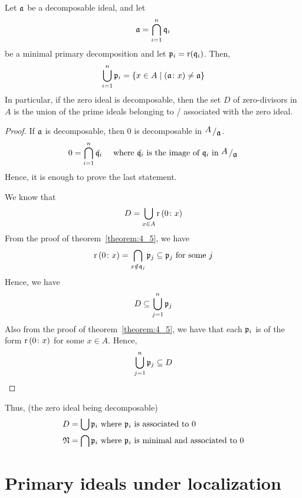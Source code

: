 \begin{proposition}{}{}
\label{prop:4_7}
	Let \(\mathfrak{a}\) be a decomposable ideal, and let
	\[
		\mathfrak{a} = \bigcap_{i = 1}^{n} \mathfrak{q}_i
	\]
	be a minimal primary decomposition and let \(\mathfrak{p}_i = \operatorname{r}(\mathfrak{q}_i)\).
	Then,
	\[
		\bigcup_{i=1}^n \mathfrak{p}_i =
		\left\{ x \in A \mid \left( \mathfrak{a} \colon x \right) \neq \mathfrak{a} \right\}
	\]
	In particular, if the zero ideal is decomposable, then the set \(D\)
	of zero-divisors in \(A\) is the union of the prime ideals
	belonging to / associated with the zero ideal.
\end{proposition}
\begin{proof}
	If \(\mathfrak{a}\) is decomposable, then 0 is decomposable in
	\(\bigslant{A}{\mfa}\).
	\[
		0 = \bigcap_{i = 1}^{n} \bar{\mfq_i} \quad \text{ where }
		\bar{\mfq_i} \text{ is the image of } \mfq_i \text{ in }
		\bigslant{A}{\mfa}
	\]
	Hence, it is enough to prove the last statement.

	We know that
	\[
		D = \bigcup_{x \in A} \operatorname{r}\left( 0 \colon x \right)
	\]
	From the proof of theorem~\ref{theorem:4_5}, we have
	\[
		\operatorname{r}\left( 0 \colon x \right) = \bigcap_{x \notin \mathfrak{q}_j} \mathfrak{p}_j
		\subseteq \mathfrak{p}_j \text{ for some } j
	\]
	Hence, we have
	\[
		D \subseteq \bigcup_{j = 1}^{n} \mathfrak{p}_j
	\]
	Also from the proof of theorem~\ref{theorem:4_5}, we have
	that each \(\mathfrak{p}_i\) is of the form \(\operatorname{r}\left( 0 \colon x \right)\)
	for some \(x \in A\).
	Hence,
	\[
		\bigcup_{j = 1}^{n} \mathfrak{p}_j \subseteq D
	\]
\end{proof}

Thus, (the zero ideal being decomposable)
\begin{align*}
	D &= \bigcup \mathfrak{p}_i \text{ where } \mathfrak{p}_i \text{ is associated to } 0 \\
	\mathfrak{N} &= \bigcap \mathfrak{p}_i \text{ where } \mathfrak{p}_i
	\text{ is minimal and associated to } 0
\end{align*}


\section{Primary ideals under localization}

